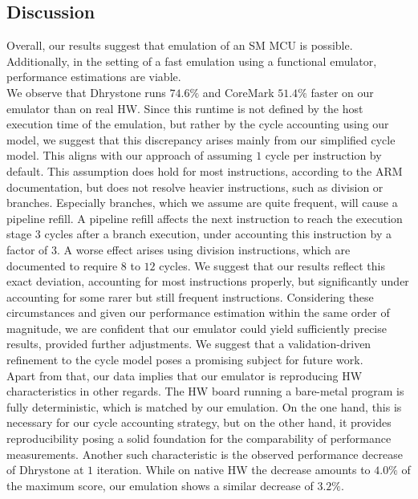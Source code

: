 \documentclass[english]{tudscrartcl}
\begin{document}
		\subsection{Discussion}
			\label{sec:eval_disc}
			Overall, our results suggest that emulation of an \ac{SM} \ac{MCU} is possible.
			Additionally, in the setting of a fast emulation using a functional emulator, performance estimations are viable.
			\\
			We observe that Dhrystone runs $74.6\%$ and CoreMark $51.4\%$ faster on our emulator than on real \ac{HW}.
			Since this runtime is not defined by the host execution time of the emulation, but rather by the cycle accounting using our model, we suggest that this discrepancy arises mainly from our simplified cycle model.
			This aligns with our approach of assuming $1$ cycle per instruction by default.
			This assumption does hold for most instructions, according to the ARM documentation, but does not resolve heavier instructions, such as division or branches.
			Especially branches, which we assume are quite frequent, will cause a pipeline refill.
			A pipeline refill affects the next instruction to reach the execution stage $3$ cycles after a branch execution, under accounting this instruction by a factor of $3$.
			A worse effect arises using division instructions, which are documented to require $8$ to $12$ cycles.
			We suggest that our results reflect this exact deviation, accounting for most instructions properly, but significantly under accounting for some rarer but still frequent instructions.
			Considering these circumstances and given our performance estimation within the same order of magnitude, we are confident that our emulator could yield sufficiently precise results, provided further adjustments.
			We suggest that a validation-driven refinement to the cycle model poses a promising subject for future work.
			\\
			Apart from that, our data implies that our emulator is reproducing \ac{HW} characteristics in other regards.
			The \ac{HW} board running a bare-metal program is fully deterministic, which is matched by our emulation.
			On the one hand, this is necessary for our cycle accounting strategy, but on the other hand, it provides reproducibility posing a solid foundation for the comparability of performance measurements.
			Another such characteristic is the observed performance decrease of Dhrystone at $1$ iteration.
			While on native \ac{HW} the decrease amounts to $4.0\%$ of the maximum score, our emulation shows a similar decrease of $3.2\%$.
\end{document}
